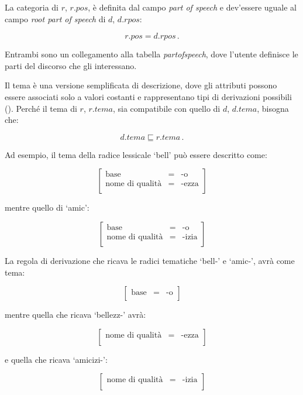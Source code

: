 \documentclass[twoside,stylearticle,11pt,filologia,it,article,bibsection]{spinoza}
\newcommand\spzradless[1]{#1\hspace{.2mm}{\scriptsize $\vdash$}}
\newcommand\spzradtema[1]{#1-}
\newcommand\spzmsussunto{\sqsubseteq}
\newenvironment{lingmeq}{\begin{lingeq}\[}{\]\end{lingeq}}
\begin{document}
La categoria di $r$, $r.{pos}$, è definita dal campo {\it part of
  speech} e dev'essere uguale al campo {\it root part of speech} di
$d$, $d.{rpos}$:
\begin{lingmeq}
r.{pos} = d.{rpos}\,.
\end{lingmeq}

Entrambi sono un collegamento alla tabella {\it partofspeech}, dove
l'utente definisce le parti del discorso che gli interessano.

Il tema è una versione semplificata di descrizione, dove gli attributi
possono essere associati solo a valori costanti e rappresentano tipi
di derivazioni possibili (\vedi {}). Perché il tema di
$r$, $r.tema$, sia compatibile con quello di $d$, $d.tema$, bisogna
che:
\begin{lingmeq}
d.tema\spzmsussunto r.tema\,. 
\end{lingmeq}

Ad esempio, il tema della radice lessicale `\spzradless{bell}'
può essere descritto come:
\begin{lingmeq}
\left[\begin{array}{lll}
\text{base}&=&\text{-o}\\
\text{nome di qualità}&=&\text{-ezza}\\
\end{array}\right]
\end{lingmeq}
\noindent mentre quello di `\spzradless{amic}':
\begin{lingmeq}
\left[\begin{array}{lll}
\text{base}&=&\text{-o}\\
\text{nome di qualità}&=&\text{-izia}\\
\end{array}\right]
\end{lingmeq}

La regola di derivazione che ricava le radici tematiche
`\spzradtema{bell}' e `\spzradtema{amic}', avrà come tema:
\begin{lingmeq}
\left[\begin{array}{lll}
\text{base}&=&\text{-o}\\
\end{array}\right]
\end{lingmeq}
\noindent mentre quella che ricava `\spzradtema{bellezz}' avrà:
\begin{lingmeq}
\left[\begin{array}{lll}
\text{nome di qualità}&=&\text{-ezza}\\
\end{array}\right]
\end{lingmeq}
\noindent e quella che ricava `\spzradtema{amicizi}':
\begin{lingmeq}
\left[\begin{array}{lll}
\text{nome di qualità}&=&\text{-izia}\\
\end{array}\right]
\end{lingmeq}
\end{document}
